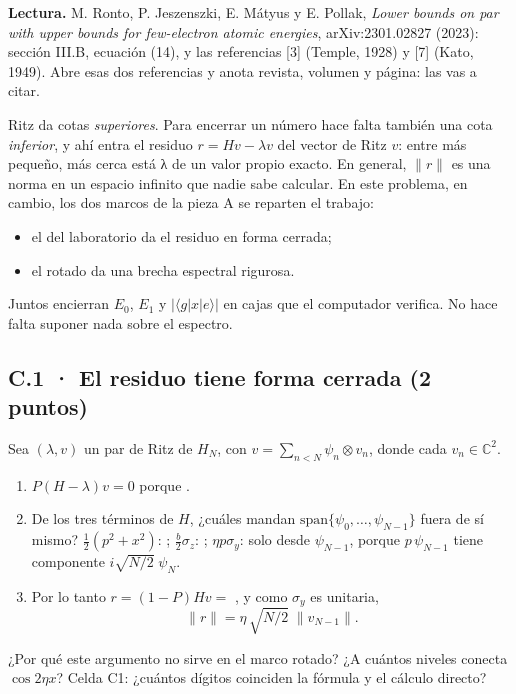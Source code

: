\textbf{Lectura.} M. Ronto, P. Jeszenszki, E. Mátyus y E. Pollak, \emph{Lower bounds on par with upper bounds for few-electron atomic energies}, arXiv:2301.02827 (2023): sección III.B, ecuación (14), y las referencias [3] (Temple, 1928) y [7] (Kato, 1949). Abre esas dos referencias y anota revista, volumen y página: las vas a citar.

Ritz da cotas \emph{superiores}. Para encerrar un número hace falta también una cota \emph{inferior}, y ahí entra el residuo $r = Hv - \lambda v$ del vector de Ritz $v$: entre más pequeño, más cerca está λ de un valor propio exacto. En general, $\|r\|$ es una norma en un espacio infinito que nadie sabe calcular. En este problema, en cambio, los dos marcos de la pieza A se reparten el trabajo:
\begin{itemize}
\tightlist
\item el del laboratorio da el residuo en forma cerrada;
\item el rotado da una brecha espectral rigurosa.
\end{itemize}
Juntos encierran $E_0$, $E_1$ y $|\langle g|x|e\rangle|$ en cajas que el computador verifica. No hace falta suponer nada sobre el espectro.

\subsection{C.1 · El residuo tiene forma cerrada (2 puntos)}

Sea $(\lambda, v)$ un par de Ritz de $H_N$, con $v = \sum_{n<N}\psi_n\otimes v_n$, donde cada $v_n \in \mathbb{C}^2$.

\begin{enumerate}
\def\labelenumi{\arabic{enumi}.}
\item $P(H-\lambda)v = 0$ porque .
\item De los tres términos de $H$, ¿cuáles mandan $\mathrm{span}\{\psi_0, \ldots, \psi_{N-1}\}$ fuera de sí mismo? $\tfrac12(p^2 + x^2)$: ; $\tfrac b2\sigma_z$: ; $\eta p\sigma_y$: solo desde $\psi_{N-1}$, porque $p\,\psi_{N-1}$ tiene componente $i\sqrt{N/2}\;\psi_N$.
\item Por lo tanto $r = (1-P)Hv = $ , y como $\sigma_y$ es unitaria,
\[ \|r\| = \eta\,\sqrt{N/2}\;\|v_{N-1}\|. \]
\end{enumerate}
¿Por qué este argumento no sirve en el marco rotado? ¿A cuántos niveles conecta $\cos 2\eta x$? Celda C1: ¿cuántos dígitos coinciden la fórmula y el cálculo directo? 

